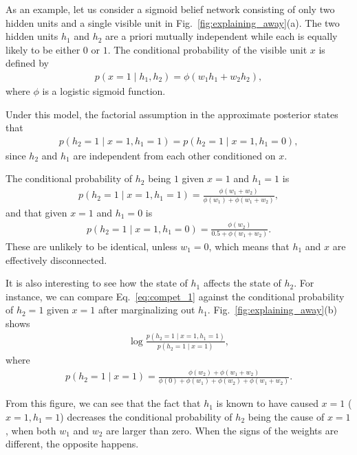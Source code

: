 \documentclass{now}
\begin{document}
As an example, let us consider a sigmoid belief network
consisting of only two hidden units and a single visible
unit in Fig.~\ref{fig:explaining_away}(a). The two hidden
units $h_1$ and $h_2$ are a priori mutually independent
while each is equally likely to be either $0$ or $1$. The
conditional probability of the visible unit $x$ is defined
by 
\begin{align*}
    p(x = 1 \mid h_1, h_2) = \phi(w_1 h_1 + w_2 h_2),
\end{align*}
where $\phi$ is a logistic sigmoid function.

Under this model, the factorial assumption in the
approximate posterior states that 
\begin{align}
    \label{eq:cond_ind}
    p(h_2 = 1 \mid x = 1, h_1 = 1) = p(h_2 = 1 \mid x = 1,
    h_1 = 0),
\end{align}
since $h_2$ and $h_1$ are independent from each other
conditioned on $x$. 

The conditional probability of $h_2$ being $1$ given $x=1$
and $h_1=1$ is 
\begin{align}
    \label{eq:compet_1}
    p(h_2 = 1 \mid x=1, h_1=1) = \frac{\phi(w_1 +
    w_2)}{\phi(w_1) + \phi(w_1 + w_2)},
\end{align}
and that given $x=1$ and $h_1=0$ is
\begin{align}
    \label{eq:compet_2}
    p(h_2 = 1 \mid x = 1, h_1 =0) = \frac{\phi(w_2)}{0.5 +
    \phi(w_1 + w_2)}.
\end{align}
These are unlikely to be identical, unless $w_1=0$, which
means that $h_1$ and $x$ are effectively disconnected. 

It is also interesting to see how the state of $h_1$ affects
the state of $h_2$. For instance, we can compare
Eq.~\eqref{eq:compet_1} against the conditional probability
of $h_2=1$ given $x=1$ after marginalizing out $h_1$.
Fig.~\ref{fig:explaining_away}(b) shows 
\begin{align*}
    \log\frac{p(h_2 = 1 \mid x=1, h_1 = 1)}{p(h_2=1 \mid
    x=1)},
\end{align*}
where
\begin{align*}
    p(h_2 = 1 \mid x = 1) = \frac{\phi(w_2) +
    \phi(w_1+w_2)}{\phi(0) + \phi(w_1) + \phi(w_2) +
    \phi(w_1+w_2)}.
\end{align*}

From this figure, we can see that the fact that $h_1$ is
known to have caused $x=1$ ($x=1,h_1=1$) decreases the
conditional probability of $h_2$ being the cause of $x=1$,
when both $w_1$ and $w_2$ are larger than zero. When the
signs of the weights are different, the opposite happens.
\end{document}
